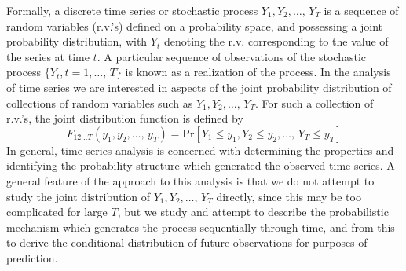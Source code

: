 Formally, a discrete time series or stochastic process $Y_1, Y_2, \ldots, \, Y_T$ is a sequence of random variables (r.v.'s) defined on a probability space, and possessing a joint probability distribution, with $Y_t$ denoting the r.v. corresponding to the value of the series at time $t$. A particular sequence of observations of the stochastic process $\{ Y_t, t=1, \ldots,  \, T\}$ is known as a realization of the process. In the analysis of time series we are interested in aspects of the joint probability distribution of collections of random variables such as $Y_1, Y_2, \ldots, \, Y_T$. For such a collection of r.v.'s, the joint distribution function is defined by
	\begin{equation}\label{eqn:feqnfirst}
	F_{12 \ldots T}\left(y_1, y_2, \ldots,  \, y_T\right)= \text{Pr}[Y_1 \leq y_1, Y_2 \leq y_2, \ldots,  	\, Y_T \leq y_T]
	\end{equation}
In general, time series analysis is concerned with determining the properties and identifying the probability structure which generated the observed time series. A general feature of the approach to this analysis is that we do not attempt to study the joint distribution of $Y_1, Y_2, \ldots, \, Y_T$ directly, since this may be too complicated for large $T$, but we study and attempt to describe the probabilistic mechanism which generates the process sequentially through time, and from this to derive the conditional distribution of future observations for purposes of prediction.



